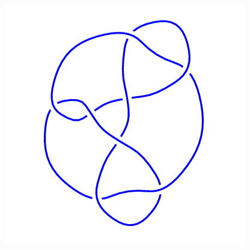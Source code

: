 \begin{figure}[H]
\begin{minipage}[b]{.18\linewidth}
    \end{minipage}
    \begin{minipage}[b]{.18\linewidth}
        \centering
        \includegraphics[width=\linewidth]{../data/8_21.png}
    \end{minipage}
\end{figure}
